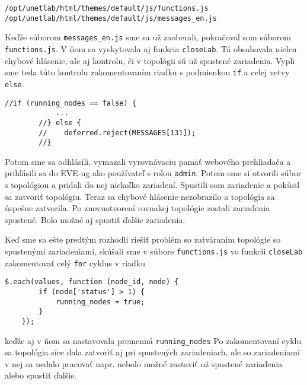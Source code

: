 \begin{Verbatim}[samepage=true]
/opt/unetlab/html/themes/default/js/functions.js
/opt/unetlab/html/themes/default/js/messages_en.js
\end{Verbatim}

Keďže súborom \texttt{messages\_en.js} sme sa už zaoberali, pokračoval som súborom \texttt{functions.js}. V ňom sa vyskytovala aj funkcia \texttt{closeLab}. Tá obsahovala nielen chybové hlásenie, ale aj kontrolu, či v topológii sú už spustené zariadenia. Vypli sme teda túto kontrolu zakomentovaním riadku s podmienkou \texttt{if} a celej vetvy \texttt{else}.

\begin{Verbatim}[samepage=true]
        //if (running_nodes == false) {
            ...
        //} else {
        //    deferred.reject(MESSAGES[131]);
        //}
\end{Verbatim}

Potom sme sa odhlásili, vymazali vyrovnávaciu pamäť webového prehliadača a prihlásili sa do EVE-ng ako používateľ s rolou \texttt{admin}. Potom sme si otvorili súbor s topológiou a pridali do nej niekoľko zariadení. Spustili som zariadenie a pokúsil sa zatvoriť topológiu. Teraz sa chybové hlásenie nezobrazilo a topológia sa úspešne zatvorila. Po znovuotvorení rovnakej topológie zostali zariadenia spustené. Bolo možné aj spustiť ďalšie zariadenia.

Keď sme sa ešte predtým rozhodli riešiť problém so zatváraním topológie so spustenými zariadeniami, skúšali sme v súbore \texttt{functions.js} vo funkcii \texttt{closeLab} zakomentovať celý \texttt{for} cyklus v riadku

\begin{Verbatim}[samepage=true]
    $.each(values, function (node_id, node) {
        if (node['status'] > 1) {
            running_nodes = true;
        }
    });
\end{Verbatim}
keďže aj v ňom sa nastavovala premenná \texttt{running\_nodes} Po zakomentovaní cyklu sa topológia síce dala zatvoriť aj pri spustených zariadeniach, ale so zariadeniami v nej sa nedalo pracovať napr. nebolo možné zastaviť už spustené zariadenia alebo spustiť ďalšie.

